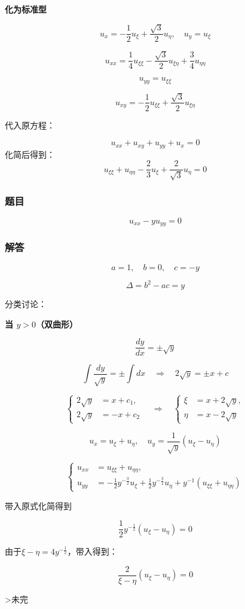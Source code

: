 \textbf{化为标准型}

\[
u_x = -\frac{1}{2} u_{\xi} + \frac{\sqrt{3}}{2} u_{\eta}, \quad u_y = u_{\xi}
\]

\[
u_{xx} = \frac{1}{4} u_{\xi \xi} - \frac{\sqrt{3}}{2} u_{\xi \eta} + \frac{3}{4} u_{\eta \eta}
\]

\[
u_{yy} = u_{\xi \xi}
\]

\[
u_{xy} = -\frac{1}{2} u_{\xi \xi} + \frac{\sqrt{3}}{2} u_{\xi \eta}
\]

代入原方程：

\[
u_{xx} + u_{xy} + u_{yy} + u_x = 0
\]
化简后得到：
\[
u_{\xi \xi} + u_{\eta \eta} - \frac{2}{3} u_{\xi} + \frac{2}{\sqrt{3}} u_{\eta} = 0
\]

\subsubsection*{题目}
\[
u_{xx} - y u_{yy} = 0
\]

\subsubsection*{解答}

\[
a = 1, \quad b = 0, \quad c = -y
\]

\[
\Delta = b^2 - ac = y
\]

分类讨论：

\textbf{当 $y > 0$（双曲形）}

\[
\frac{dy}{dx} = \pm \sqrt{y}
\]

\[
\int \frac{dy}{\sqrt{y}} = \pm \int dx \quad \Longrightarrow \quad 2\sqrt{y} = \pm x + c
\]

\[
\left\{
\begin{aligned}
2\sqrt{y} &= x + c_1, \\
2\sqrt{y} &= -x + c_2
\end{aligned}
\right.
\quad \Longrightarrow \quad
\left\{
\begin{aligned}
\xi &= x + 2\sqrt{y}, \\
\eta &= x - 2\sqrt{y}
\end{aligned}
\right.
\]

\[
u_x = u_{\xi} + u_{\eta}, \quad u_y = \frac{1}{\sqrt{y}} ( u_{\xi} - u_{\eta} )
\]

\[
\left\{
\begin{aligned}
u_{xx} &= u_{\xi \xi} + u_{\eta \eta}, \\
u_{yy} &= -\frac{1}{2} y^{- \frac{3}{2}} u_{\xi} + \frac{1}{2} y^{-\frac{3}{2}} u_{\eta} + y^{-1} (u_{\xi \xi} + u_{\eta \eta})
\end{aligned}
\right.
\]

带入原式化简得到

\[
\frac{1}{2} y^{-\frac{1}{2}} (u_{\xi} - u_{\eta}) = 0
\]

由于\(\xi - \eta = 4y^{-\frac{1}{2}}\)，带入得到：

\[
\frac{2}{\xi - \eta} (u_{\xi} - u_{\eta}) = 0
\]

>未完